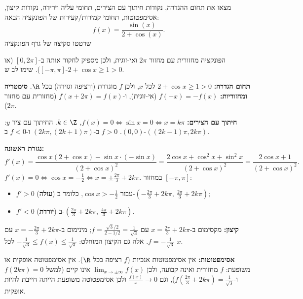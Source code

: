 
\begin{question}
מצאו את תחום ההגדרה, נקודות חיתוך עם הצירים, תחומי עליה וירידה, נקודות קיצון, אסימפטוטות, תחומי קמירות/קעירות של הפונקציה הבאה:
\[ f(x)=\frac{\sin(x)}{2+\cos(x)}. \]
שרטטו סקיצה של גרף הפונקציה
\end{question}

\begin{hint}
הפונקציה מחזורית עם מחזור $2\pi$ ואי-זוגית, ולכן מספיק לחקור אותה ב-$[0,2\pi]$ (או $[-\pi,\pi]$). שימו לב ש-$2+\cos x\ge1>0$.
\end{hint}

\begin{solution}
\textbf{תחום הגדרה:} $2+\cos x\ge1>0$ לכל $x$, ולכן $f$ מוגדרת (ורציפה וגזירה) בכל $\R$.
\textbf{סימטריה ומחזוריות:} $f(-x)=-f(x)$ (אי-זוגית), ו-$f(x+2\pi)=f(x)$ (מחזורית עם מחזור $2\pi$).

\textbf{חיתוך עם הצירים:} $f(x)=0\iff\sin x=0\iff x=k\pi$, $k\in\Z$. החיתוך עם ציר $y$: $(0,0)$. $f>0$ ב-$(2k\pi,(2k+1)\pi)$ ו-$f<0$ ב-$((2k-1)\pi,2k\pi)$.

\textbf{נגזרת ראשונה:}
\[ f'(x)=\frac{\cos x(2+\cos x)-\sin x\cdot(-\sin x)}{(2+\cos x)^2}=\frac{2\cos x+\cos^2x+\sin^2x}{(2+\cos x)^2}=\frac{2\cos x+1}{(2+\cos x)^2}. \]
$f'(x)=0\iff\cos x=-\frac12\iff x=\pm\frac{2\pi}{3}+2k\pi$. במחזור $[-\pi,\pi]$:
\begin{itemize}
  \item $f'>0$ (\textbf{עולה}) עבור $\cos x>-\frac12$, כלומר ב-$\left(-\frac{2\pi}3+2k\pi,\ \frac{2\pi}3+2k\pi\right)$;
  \item $f'<0$ (\textbf{יורדת}) ב-$\left(\frac{2\pi}3+2k\pi,\ \frac{4\pi}3+2k\pi\right)$.
\end{itemize}
\textbf{קיצון:} מקסימום ב-$x=\frac{2\pi}3+2k\pi$ עם $f=\frac{\sqrt3/2}{2-1/2}=\frac{1}{\sqrt3}$; מינימום ב-$x=-\frac{2\pi}3+2k\pi$ עם $f=-\frac1{\sqrt3}$. אלה גם הקיצון המוחלט: $-\frac1{\sqrt3}\le f(x)\le\frac1{\sqrt3}$ לכל $x$.

\textbf{אסימפטוטות:} אין אסימפטוטות אנכיות ($f$ רציפה בכל $\R$). אין אסימפטוטה אופקית או משופעת: $f$ מחזורית ואינה קבועה, ולכן $\lim_{x\to\pm\infty}f(x)$ אינו קיים (למשל $f(2k\pi)=0$ ו-$f(\frac{2\pi}3+2k\pi)=\frac1{\sqrt3}$), וגם $\frac{f(x)}{x}\to0$ ולכן אסימפטוטה משופעת הייתה חייבת להיות אופקית.


\end{solution}
